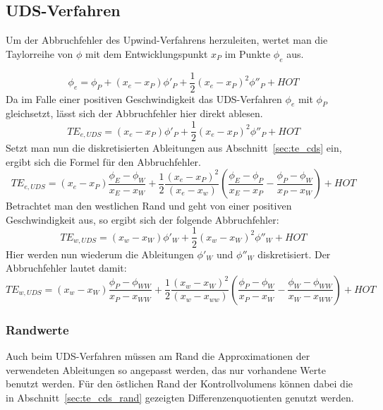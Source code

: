 \subsection{UDS-Verfahren}

Um der Abbruchfehler des Upwind-Verfahrens herzuleiten, wertet man die
Taylorreihe von $\phi$ mit dem Entwicklungspunkt $x_P$ im Punkte $\phi_e$
aus.

\begin{equation*}
  \phi_e = \phi_P +(x_e-x_P) \phi'_P + \frac{1}{2} (x_e-x_P)^2 \phi''_P+HOT
\end{equation*}
Da im Falle einer positiven Geschwindigkeit das UDS-Verfahren $\phi_e$ mit $\phi_P$
gleichsetzt, lässt sich der Abbruchfehler hier direkt ablesen.
\begin{equation*}
  TE_{e, UDS} = (x_e-x_P) \phi'_P + \frac{1}{2} (x_e-x_P)^2 \phi''_P+HOT
\end{equation*}
Setzt man nun die diskretisierten Ableitungen aus Abschnitt~\ref{sec:te_cds} ein,
ergibt sich die Formel für den Abbruchfehler.
\begin{equation}
  TE_{e, UDS} = (x_e-x_P) \frac{\phi_E-\phi_W}{x_E-x_W}+
  \frac{1}{2} \frac{(x_e-x_P)^2}{(x_e-x_w)} \left({\frac{\phi_E-\phi_P}{x_E-x_P}
  - \frac{\phi_P-\phi_W}{x_P-x_W} }\right)+HOT
\end{equation}
Betrachtet man den westlichen Rand und geht von einer positiven Geschwindigkeit aus,
so ergibt sich der folgende Abbruchfehler:
\begin{equation*}
  TE_{w, UDS} = (x_w-x_W) \phi'_W + \frac{1}{2} (x_w-x_W)^2 \phi''_W + HOT
\end{equation*}
Hier werden nun wiederum die Ableitungen $\phi'_W$ und $\phi''_W$ diskretisiert. Der
Abbruchfehler lautet damit:
\begin{equation}
  TE_{w, UDS} = (x_w-x_W) \frac{\phi_P-\phi_{WW}}{x_P-x_{WW}}+
  \frac{1}{2} \frac{(x_w-x_W)^2}{(x_w-x_{ww})} \left({\frac{\phi_P-\phi_W}{x_P-x_W}
  - \frac{\phi_W-\phi_{WW}}{x_W-x_{WW}} }\right)+HOT
\end{equation}



\subsubsection{Randwerte}

Auch beim UDS-Verfahren müssen am Rand die Approximationen der verwendeten Ableitungen
so angepasst werden, das nur vorhandene Werte benutzt werden.
Für den östlichen Rand der Kontrollvolumens können dabei die in Abschnitt~\ref{sec:te_cds_rand}
gezeigten Differenzenquotienten genutzt werden.

